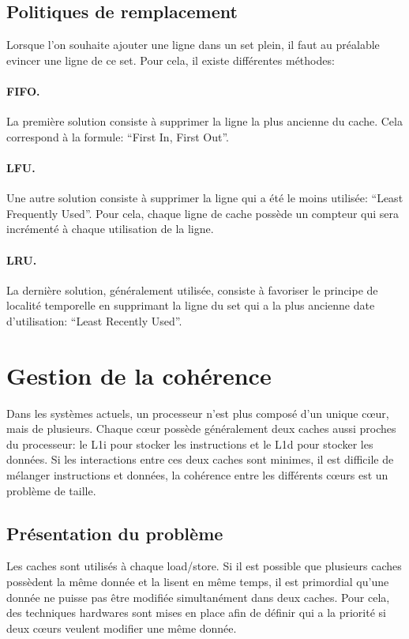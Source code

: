 \documentclass[a4paper]{article}
\begin{document}
\subsection{Politiques de remplacement}
\indent Lorsque l'on souhaite ajouter une ligne dans un set plein, il faut au préalable evincer une ligne de ce set. Pour cela, il existe différentes méthodes:

\paragraph{FIFO.} La première solution consiste à supprimer la ligne la plus ancienne du cache. Cela correspond à la formule: ``First In, First Out''.

\paragraph{LFU.} Une autre solution consiste à supprimer la ligne qui a été le moins utilisée: ``Least Frequently Used''. Pour cela, chaque ligne de cache possède un compteur qui sera incrémenté à chaque utilisation de la ligne. 

\paragraph{LRU.} La dernière solution, généralement utilisée, consiste à favoriser le principe de localité temporelle en supprimant la ligne du set qui a la plus ancienne date d'utilisation: ``Least Recently Used''.

\newpage
\section{Gestion de la cohérence}
\indent Dans les systèmes actuels, un processeur n'est plus composé d'un unique c{\oe}ur, mais de plusieurs. Chaque c{\oe}ur possède généralement deux caches aussi proches du processeur: le L1i pour stocker les instructions et le L1d pour stocker les données. Si les interactions entre ces deux caches sont minimes, il est difficile de mélanger instructions et données, la cohérence entre les différents c{\oe}urs est un problème de taille.

\subsection{Présentation du problème}
\indent Les caches sont utilisés à chaque load/store. Si il est possible que plusieurs caches possèdent la même donnée et la lisent en même temps, il est primordial qu'une donnée ne puisse pas être modifiée simultanément dans deux caches. Pour cela, des techniques hardwares sont mises en place afin de définir qui a la priorité si deux c{\oe}urs veulent modifier une même donnée. \\
\end{document}
